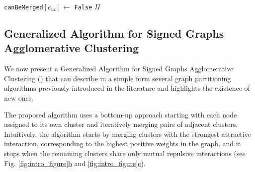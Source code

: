 \begin{algorithm}[t]
\begin{algorithmic}[1]
        \EndIf
          \State \texttt{canBeMerged}$[e_{uv}] \gets$ \texttt{False}
        \EndIf
      \EndWhile
      \State
      \Return $\Pi$



  \end{algorithmic}
  \label{main_alg}
\end{algorithm}

\subsection{Generalized Algorithm for Signed Graphs Agglomerative Clustering} \label{sec:algorithm}

We now present a Generalized Algorithm for Signed Graphs Agglomerative Clustering (\algname) that can describe in a simple form several graph partitioning algorithms previously introduced in the literature and highlights the existence of new ones.

The proposed algorithm uses a bottom-up approach starting with each node assigned to its own cluster and iteratively merging pairs of adjacent clusters. Intuitively, the algorithm starts by merging clusters with the strongest attractive interaction, corresponding to the highest positive weights in the graph, and it stops when the remaining clusters share only mutual repulsive interactions (see Fig. \hyperref[fig:intro_figure]{\ref*{fig:intro_figure}b} and \hyperref[fig:intro_figure]{\ref*{fig:intro_figure}c}). 

